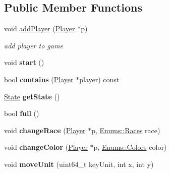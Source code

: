 \subsection*{Public Member Functions}
\begin{DoxyCompactItemize}
\item 
void \hyperlink{class_game_1_1_game_a8686480ec3d4c7bfcd3ad291dd9b0e68}{add\+Player} (\hyperlink{class_game_1_1_player}{Player} $\ast$p)
\begin{DoxyCompactList}\small\item\em add player to game \end{DoxyCompactList}\item 
\mbox{\label{class_game_1_1_game_a38bc10d6ea07e82ca028938bc0e7513c}} 
void {\bfseries start} ()
\item 
\mbox{\label{class_game_1_1_game_a21f12dbd350321ad6ca85bc64313881f}} 
bool {\bfseries contains} (\hyperlink{class_game_1_1_player}{Player} $\ast$player) const
\item 
\mbox{\label{class_game_1_1_game_af1aebf44eed584e43f07bd48badb5e0d}} 
\hyperlink{class_game_1_1_game_a372bbb1ac29108132252ef735f03867f}{State} {\bfseries get\+State} ()
\item 
\mbox{\label{class_game_1_1_game_a93b334fe6fb3aef6e628b3646046857d}} 
bool {\bfseries full} ()
\item 
\mbox{\label{class_game_1_1_game_a43436c805ad02a9112c3ca660fdfc5e1}} 
void {\bfseries change\+Race} (\hyperlink{class_game_1_1_player}{Player} $\ast$p, \hyperlink{_enums_8hpp_a04ca481553f9a4e7ed98901dbf50951f}{Enums\+::\+Races} race)
\item 
\mbox{\label{class_game_1_1_game_a548d44529ffae4bd7f29225a183a043a}} 
void {\bfseries change\+Color} (\hyperlink{class_game_1_1_player}{Player} $\ast$p, \hyperlink{_enums_8hpp_abb0511074ee3233e3e580a22e3890526}{Enums\+::\+Colors} color)
\item 
\mbox{\label{class_game_1_1_game_ac3627a87d68d0d0006447fd38bd3f864}} 
void {\bfseries move\+Unit} (uint64\+\_\+t key\+Unit, int x, int y)
\item 

\end{DoxyCompactItemize}
